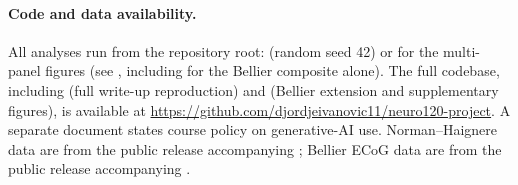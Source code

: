 \documentclass[11pt]{article}
\begin{document}
\paragraph{Code and data availability.} All analyses run from the repository root:  (random seed 42) or  for the multi-panel figures (see , including  for the Bellier composite alone). The full codebase, including  (full write-up reproduction) and  (Bellier extension and supplementary figures), is available at \url{https://github.com/djordjeivanovic11/neuro120-project}. A separate document states course policy on generative-AI use. Norman--Haignere data are from the public release accompanying \citet{NormanHaignere2022}; Bellier ECoG data are from the public release accompanying \citet{Bellier2023}.
\end{document}
